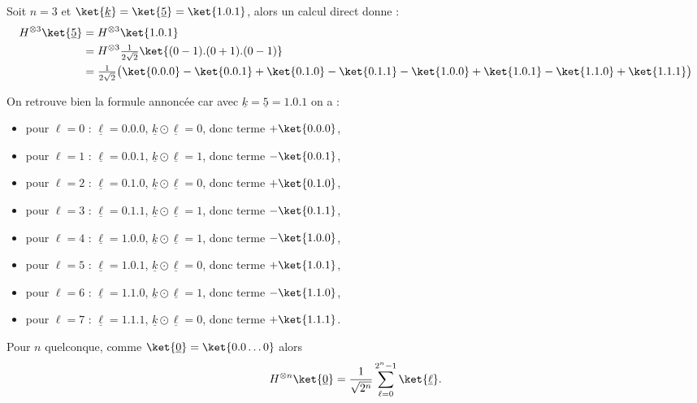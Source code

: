 \documentclass[11pt,class=report,crop=false]{standalone}
\begin{document}
\begin{exemple}
Soit $n=3$ et $\ket{\underline{k}} = \ket{\underline{5}} = \ket{1.0.1}$, alors
un calcul direct donne :
\begin{align*}
H^{\otimes 3} \ket{\underline{5}} 
  &= H^{\otimes 3}\ket{1.0.1} \\
  &= H^{\otimes 3}\tfrac{1}{2\sqrt2} \ket{(0-1).(0+1).(0-1)} \\
  &= \tfrac{1}{2\sqrt2}\big( \ket{0.0.0} - \ket{0.0.1} + \ket{0.1.0} - \ket{0.1.1} 
-  \ket{1.0.0} + \ket{1.0.1} - \ket{1.1.0} + \ket{1.1.1}\big) \\
\end{align*}

On retrouve bien la formule annoncée car avec $\underline{k} = \underline{5} = 1.0.1$ on a :
\begin{itemize}
	\item pour $\ell = 0$ : $\underline\ell = 0.0.0$, $\underline k \odot \underline{\ell} = 0$, donc terme $+\ket{0.0.0}$,
	\item pour $\ell = 1$ : $\underline\ell = 0.0.1$, $\underline k \odot \underline{\ell} = 1$, donc terme $-\ket{0.0.1}$,
	\item pour $\ell = 2$ : $\underline\ell = 0.1.0$, $\underline k \odot \underline{\ell} = 0$, donc terme $+\ket{0.1.0}$,
	\item pour $\ell = 3$ : $\underline\ell = 0.1.1$, $\underline k \odot \underline{\ell} = 1$, donc terme $-\ket{0.1.1}$,
	\item pour $\ell = 4$ : $\underline\ell = 1.0.0$, $\underline k \odot \underline{\ell} = 1$, donc terme $-\ket{1.0.0}$,
	\item pour $\ell = 5$ : $\underline\ell = 1.0.1$, $\underline k \odot \underline{\ell} = 0$, donc terme $+\ket{1.0.1}$,
	\item pour $\ell = 6$ : $\underline\ell = 1.1.0$, $\underline k \odot \underline{\ell} = 1$, donc terme $-\ket{1.1.0}$,
	\item pour $\ell = 7$ : $\underline\ell = 1.1.1$, $\underline k \odot \underline{\ell} = 0$, donc terme $+\ket{1.1.1}$.
\end{itemize}
\end{exemple}

\begin{exemple}
Pour $n$ quelconque, comme $\ket{\underline 0} = \ket{0.0\ldots0}$ alors
$$H^{\otimes n} \ket{\underline{0}} = \frac{1}{\sqrt{2^n}} \sum_{\ell=0}^{2^n-1} \ket{\underline\ell}.$$
\end{exemple}
\end{document}
